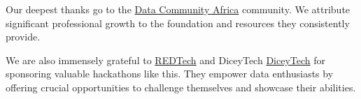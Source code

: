 

{Our deepest thanks go to the \href{https://www.linkedin.com/company/datafestafrica/}{Data Community Africa} community. We attribute significant professional growth to the foundation and resources they consistently provide.
\vspace{\myvspace}

We are also immensely grateful to \href{https://www.linkedin.com/company/redtech-africa/}{REDTech} and DiceyTech \href{https://www.linkedin.com/company/diceytech/}{DiceyTech} for sponsoring valuable hackathons like this. They empower data enthusiasts by offering crucial opportunities to challenge themselves and showcase their abilities.}

\MediaOptionLogicBlank